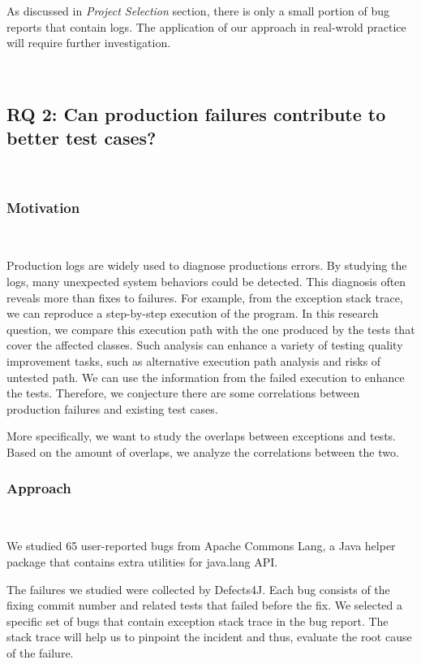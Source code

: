 		 As discussed in \textit{Project Selection} section, there is only a small portion of bug reports that contain logs. The application of our approach in real-wrold practice will require further investigation.

	~\\


\subsection{RQ 2: Can production failures contribute to better test cases?}~

	\subsubsection{Motivation}~
		
		Production logs are widely used to diagnose productions errors. By studying the logs, many unexpected system behaviors could be detected. This diagnosis often reveals more than fixes to failures. For example, from the exception stack trace, we can reproduce a step-by-step execution of the program. In this research question, we compare this execution path with the one produced by the tests that cover the affected classes. Such analysis can enhance a variety of testing quality improvement tasks, such as alternative execution path analysis and risks of untested path. We can use the information from the failed execution to enhance the tests. Therefore, we conjecture there are some correlations between production failures and existing test cases.

		More specifically, we want to study the overlaps between exceptions and tests. Based on the amount of overlaps, we analyze the correlations between the two.
	~\\

	\subsubsection{Approach}~

		We studied 65 user-reported bugs from Apache Commons Lang, a Java helper package that contains extra utilities for java.lang API. 

		The failures we studied were collected by Defects4J. Each bug consists of the fixing commit number and related tests that failed before the fix. We selected a specific set of bugs that contain exception stack trace in the bug report. The stack trace will help us to pinpoint the incident and thus, evaluate the root cause of the failure. 

